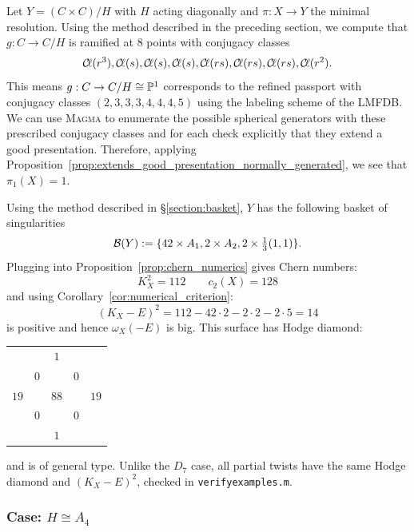 \documentclass[main.tex]{subfiles}
\begin{document}
Let $Y = (C \times C)/H$ with $H$ acting diagonally and $\pi : X \to Y$ the minimal resolution. 
Using the method described in the preceding section, we compute that $g : C \to C / H$ is ramified at $8$ points with conjugacy classes
\[ \Cl(r^3), \Cl(s), \Cl(s), \Cl(s), \Cl(rs), \Cl(rs), \Cl(rs), \Cl(r^2). \]
This means $g : C \to C / H \cong \P^1$ corresponds to the refined passport 
\cite{lmfdb:hgcwa-14.12-4.0.2-2-2-2-2-2-2-3.5} with conjugacy classes $(2, 3, 3, 3, 4, 4, 4, 5)$ using the labeling scheme of the LMFDB. We can use \textsc{Magma} to enumerate the possible spherical generators with these prescribed conjugacy classes and for each check explicitly that they extend a good presentation. Therefore, applying Proposition~\ref{prop:extends_good_presentation_normally_generated}, we see that $\pi_1(X) = 1$. 
\par 
Using the method described in \S\ref{section:basket}, $Y$ has the following basket of singularities
\[ \cB(Y) := \{ 42 \times A_1, 2 \times A_2, 2 \times \tfrac{1}{3} (1,1) \}. \]
Plugging into Proposition~\ref{prop:chern_numerics} gives Chern numbers:
\[ K_X^2 = 112 \quad \quad c_2(X) = 128 \]
and using Corollary~\ref{cor:numerical_criterion}:
\[ (K_X - E)^2 = 112 - 42 \cdot 2 - 2 \cdot 2 - 2 \cdot 5 = 14 \]
is positive and hence $\omega_X(-E)$ is big. This surface has Hodge diamond:
\begin{center}
\begin{tabular}{ccccc}
 &  & $1$ &  &  \\
 & $0$ &  & $0$ &  \\
$19$ &  & $88$ &  & $19$ \\
 & $0$ &  & $0$ &  \\
 &  & $1$ &  &  \\
\end{tabular}    
\end{center}
and is of general type. Unlike the $D_7$ case, all partial twists have the same Hodge diamond and $(K_X - E)^2$, checked in \texttt{verify\textunderscore examples.m}.

\subsubsection{Case: $H \cong A_4$} \label{section:case_A4}
\end{document}
